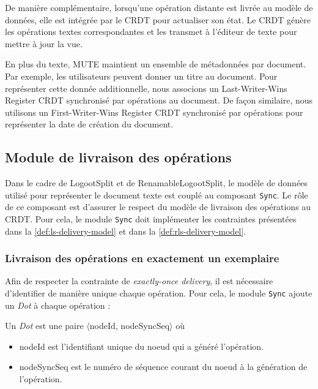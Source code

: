 De manière complémentaire, lorsqu'une opération distante est livrée au modèle de données, elle est intégrée par le \ac{CRDT} pour actualiser son état.
Le \ac{CRDT} génère les opérations textes correspondantes et les transmet à l'éditeur de texte pour mettre à jour la vue.

En plus du texte, MUTE maintient un ensemble de métadonnées par document.
Par exemple, les utilisateurs peuvent donner un titre au document.
Pour représenter cette donnée additionnelle, nous associons un Last-Writer-Wins Register \ac{CRDT} synchronisé par opérations \cite{shapiro_2011_crdt} au document.
De façon similaire, nous utilisons un First-Writer-Wins Register \ac{CRDT} synchronisé par opérations pour représenter la date de création du document.

\subsection{Module de livraison des opérations}

Dans le cadre de LogootSplit et de RenamableLogootSplit, le modèle de données utilisé pour représenter le document texte est couplé au composant \texttt{Sync}.
Le rôle de ce composant est d'assurer le respect du modèle de livraison des opérations au \ac{CRDT}.
Pour cela, le module \texttt{Sync} doit implémenter les contraintes présentées dans la \autoref{def:ls-delivery-model} et dans la \autoref{def:rls-delivery-model}.

\subsubsection{Livraison des opérations en exactement un exemplaire}

\label{sec:mute-exactly-once-delivery}

Afin de respecter la contrainte de \emph{exactly-once delivery}, il est nécessaire d'identifier de manière unique chaque opération.
Pour cela, le module \texttt{Sync} ajoute un \emph{Dot} \cite{2014-scalable-accurate-causality-tracking} à chaque opération :

\begin{definition}[Dot]
  Un \emph{Dot} est une paire $\langle$nodeId, nodeSyncSeq$\rangle$ où
  \begin{itemize}
    \item nodeId est l'identifiant unique du noeud qui a généré l'opération.
    \item nodeSyncSeq est le numéro de séquence courant du noeud à la génération de l'opération.
  \end{itemize}
\end{definition}

